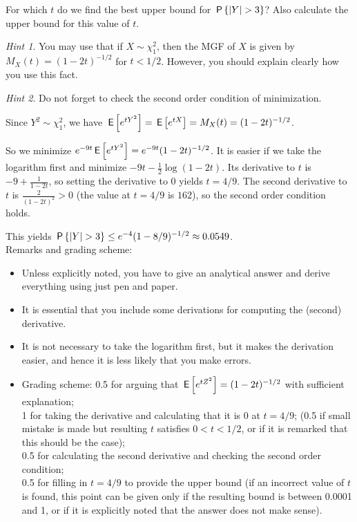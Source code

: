 \begin{exercise}[2.5]
For which $t$ do we find the best upper bound for  $\P{|Y| > 3}$? Also calculate the upper bound for this value of $t$.

\textit{Hint 1}. You may use that if $X \sim \chi^2_1$, then the MGF of $X$ is given by $M_X(t) = (1-2t)^{-1/2}$ for $t < 1/2$. However, you should explain clearly how you use this fact.

\textit{Hint 2}. Do not forget to check the second order condition of minimization. \\
\begin{solution}
Since $Y^2 \sim \chi^2_1$, we have $\E{e^{t Y^2}}  = \E{e^{t X}} = M_X(t) =  (1-2t)^{-1/2}$. 

So we minimize $ e^{-9t}\E{e^{t Y^2}} = e^{-9t}(1-2t)^{-1/2}$. It is easier if we take the logarithm first and minimize $-9t - \tfrac12 \log(1-2t)$. Its derivative to $t$ is $-9 + \frac1{1-2t}$, so setting the derivative to 0 yields $t = 4/9$. The second derivative to $t$ is  $\frac{2}{(1-2t)^2} > 0$ (the value at $t=4/9$ is $162$), so the second order condition holds.


This yields $\P{|Y| > 3} \leq e^{-4}(1-8/9)^{-1/2} \approx 0.0549$. \\

\noindent Remarks and grading scheme:
\begin{itemize}
\item Unless explicitly noted, you have to give an analytical answer and derive everything using just pen and paper. 
\item It is essential that you include some derivations for computing the (second) derivative. 
\item It is not necessary to take the logarithm first, but it makes the derivation easier, and hence it is less likely that you make errors. 
\item Grading scheme: 0.5 for arguing that $\E{e^{t Z^2}}  =  (1-2t)^{-1/2}$ with sufficient explanation; \\ 1 for taking the derivative and calculating that it is 0 at $t=4/9$; (0.5 if small mistake is made but resulting $t$ satisfies $0 < t < 1/2$, or if it is remarked that this should be the case); \\ 
0.5 for calculating the second derivative and checking the second order condition; \\ 0.5 for filling in $t=4/9$ to provide the upper bound (if an incorrect value of $t$ is found, this point can be given only if the resulting bound is between 0.0001 and 1, or if it is explicitly noted that the answer does not make sense). 
\end{itemize}
\end{solution}
\end{exercise}


